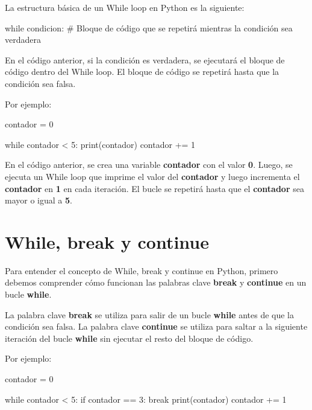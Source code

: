 \documentclass[
  a4paper,
  DIV=11,
  numbers=noendperiod,
  onepage,
  openany]{scrreprt}
\newenvironment{Shaded}{\begin{snugshade}}{\end{snugshade}}
\newcommand{\BuiltInTok}[1]{\textcolor[rgb]{0.00,0.23,0.31}{#1}}
\newcommand{\CommentTok}[1]{\textcolor[rgb]{0.37,0.37,0.37}{#1}}
\newcommand{\ControlFlowTok}[1]{\textcolor[rgb]{0.00,0.23,0.31}{#1}}
\newcommand{\DecValTok}[1]{\textcolor[rgb]{0.68,0.00,0.00}{#1}}
\newcommand{\NormalTok}[1]{\textcolor[rgb]{0.00,0.23,0.31}{#1}}
\newcommand{\OperatorTok}[1]{\textcolor[rgb]{0.37,0.37,0.37}{#1}}
\begin{document}
La estructura básica de un While loop en Python es la siguiente:

\begin{Shaded}
\begin{Highlighting}[]
\ControlFlowTok{while}\NormalTok{ condicion:}
    \CommentTok{\# Bloque de código que se repetirá mientras la condición sea verdadera}
\end{Highlighting}
\end{Shaded}

En el código anterior, si la condición es verdadera, se ejecutará el
bloque de código dentro del While loop. El bloque de código se repetirá
hasta que la condición sea falsa.

Por ejemplo:

\begin{Shaded}
\begin{Highlighting}[]
\NormalTok{contador }\OperatorTok{=} \DecValTok{0}

\ControlFlowTok{while}\NormalTok{ contador }\OperatorTok{\textless{}} \DecValTok{5}\NormalTok{:}
    \BuiltInTok{print}\NormalTok{(contador)}
\NormalTok{    contador }\OperatorTok{+=} \DecValTok{1}
\end{Highlighting}
\end{Shaded}

En el código anterior, se crea una variable \textbf{contador} con el
valor \textbf{0}. Luego, se ejecuta un While loop que imprime el valor
del \textbf{contador} y luego incrementa el \textbf{contador} en
\textbf{1} en cada iteración. El bucle se repetirá hasta que el
\textbf{contador} sea mayor o igual a \textbf{5}.

\section{While, break y continue}\label{while-break-y-continue}

Para entender el concepto de While, break y continue en Python, primero
debemos comprender cómo funcionan las palabras clave \textbf{break} y
\textbf{continue} en un bucle \textbf{while}.

La palabra clave \textbf{break} se utiliza para salir de un bucle
\textbf{while} antes de que la condición sea falsa. La palabra clave
\textbf{continue} se utiliza para saltar a la siguiente iteración del
bucle \textbf{while} sin ejecutar el resto del bloque de código.

Por ejemplo:

\begin{Shaded}
\begin{Highlighting}[]
\NormalTok{contador }\OperatorTok{=} \DecValTok{0}

\ControlFlowTok{while}\NormalTok{ contador }\OperatorTok{\textless{}} \DecValTok{5}\NormalTok{:}
    \ControlFlowTok{if}\NormalTok{ contador }\OperatorTok{==} \DecValTok{3}\NormalTok{:}
        \ControlFlowTok{break}
    \BuiltInTok{print}\NormalTok{(contador)}
\NormalTok{    contador }\OperatorTok{+=} \DecValTok{1}
\end{Highlighting}
\end{Shaded}
\end{document}
